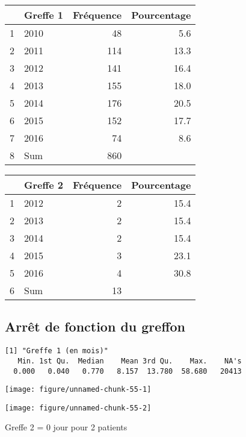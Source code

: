 \documentclass[11pt,a4paper]{article}\usepackage[]{graphicx}\usepackage[]{color}
\makeatletter
\def\maxwidth{ %
  \ifdim\Gin@nat@width>\linewidth
    \linewidth
  \else
    \Gin@nat@width
  \fi
}
\newenvironment{kframe}{%
 \def\at@end@of@kframe{}%
 \ifinner\ifhmode%
  \def\at@end@of@kframe{\end{minipage}}%
  \begin{minipage}{\columnwidth}%
 \fi\fi%
 \def\FrameCommand##1{\hskip\@totalleftmargin \hskip-\fboxsep
 \colorbox{shadecolor}{##1}\hskip-\fboxsep
     \hskip-\linewidth \hskip-\@totalleftmargin \hskip\columnwidth}%
 \MakeFramed {\advance\hsize-\width
   \@totalleftmargin\z@ \linewidth\hsize
   \@setminipage}}%
 {\par\unskip\endMakeFramed%
 \at@end@of@kframe}
\newenvironment{knitrout}{}{} %
\makeatother
\begin{document}
\begin{table}[H]
\centering
\begin{tabular}{llrr}
  \hline
 & Greffe 1 & Fréquence & Pourcentage \\ 
  \hline
1 & 2010 & 48 & 5.6 \\ 
  2 & 2011 & 114 & 13.3 \\ 
  3 & 2012 & 141 & 16.4 \\ 
  4 & 2013 & 155 & 18.0 \\ 
  5 & 2014 & 176 & 20.5 \\ 
  6 & 2015 & 152 & 17.7 \\ 
  7 & 2016 & 74 & 8.6 \\ 
  8 & Sum & 860 &  \\ 
   \hline
\end{tabular}
\end{table}
\begin{table}[H]
\centering
\begin{tabular}{llrr}
  \hline
 & Greffe 2 & Fréquence & Pourcentage \\ 
  \hline
1 & 2012 &  2 & 15.4 \\ 
  2 & 2013 &  2 & 15.4 \\ 
  3 & 2014 &  2 & 15.4 \\ 
  4 & 2015 &  3 & 23.1 \\ 
  5 & 2016 &  4 & 30.8 \\ 
  6 & Sum & 13 &  \\ 
   \hline
\end{tabular}
\end{table}



  \subsection{Arrêt de fonction du greffon}
  
\begin{knitrout}
\color{fgcolor}\begin{kframe}
\begin{verbatim}
[1] "Greffe 1 (en mois)"
   Min. 1st Qu.  Median    Mean 3rd Qu.    Max.    NA's 
  0.000   0.040   0.770   8.157  13.780  58.680   20413 
\end{verbatim}
\end{kframe}
\texttt{[image: figure/unnamed-chunk-55-1]} 

\texttt{[image: figure/unnamed-chunk-55-2]} 

\end{knitrout}
Greffe 2 = 0 jour pour 2 patients
~\\
\end{document}
